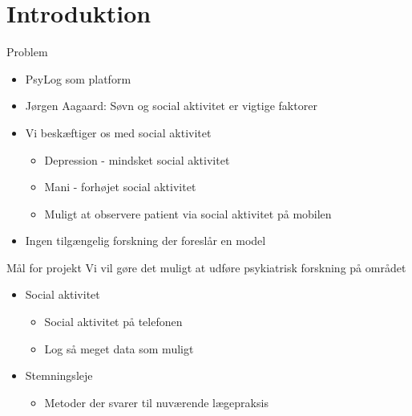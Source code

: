 \section{Introduktion}
{%
	\begin{frame}{Problem} %
\begin{itemize}
	\item PsyLog som platform
	\item Jørgen Aagaard: Søvn og social aktivitet er vigtige faktorer
	\item Vi beskæftiger os med social aktivitet
	\begin{itemize}
		\item Depression - mindsket social aktivitet
		\item Mani - forhøjet social aktivitet
		\item Muligt at observere patient via social aktivitet på mobilen
	\end{itemize}
	\item Ingen tilgængelig forskning der foreslår en model
\end{itemize}

\end{frame}}


{ %
	\begin{frame}{Mål for projekt} %
		Vi vil gøre det muligt at udføre psykiatrisk forskning på området
		\begin{itemize}
			\item Social aktivitet
			\begin{itemize}
				\item Social aktivitet på telefonen
				\item Log så meget data som muligt
			\end{itemize}	
			\item Stemningsleje
			\begin{itemize}
				\item Metoder der svarer til nuværende lægepraksis
			\end{itemize}
		\end{itemize}
	\end{frame}}
	



